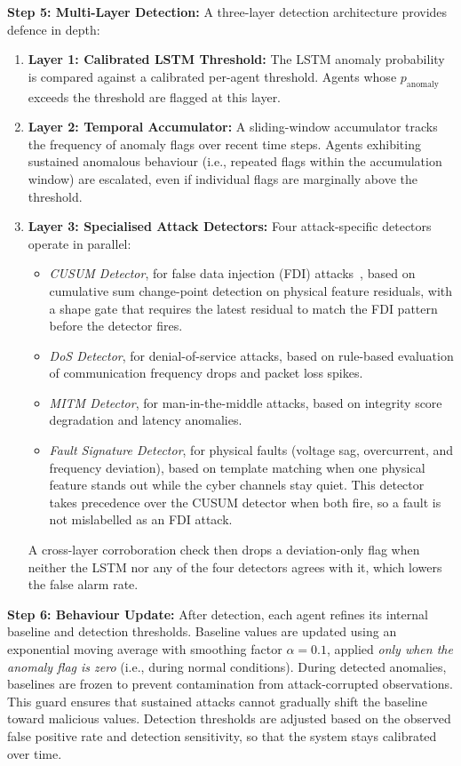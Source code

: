 \par \vspace{0.35cm}
\noindent
\textbf{Step 5: Multi-Layer Detection:} A three-layer detection architecture provides defence in depth:
\begin{enumerate}
    \item \textbf{Layer 1: Calibrated LSTM Threshold:} The LSTM anomaly probability is compared against a calibrated per-agent threshold. Agents whose $p_{\text{anomaly}}$ exceeds the threshold are flagged at this layer.
    \item \textbf{Layer 2: Temporal Accumulator:} A sliding-window accumulator tracks the frequency of anomaly flags over recent time steps. Agents exhibiting sustained anomalous behaviour (i.e., repeated flags within the accumulation window) are escalated, even if individual flags are marginally above the threshold.
    \item \textbf{Layer 3: Specialised Attack Detectors:} Four attack-specific detectors operate in parallel:
    \begin{itemize}
        \item \textit{CUSUM Detector}, for false data injection (FDI) attacks~\cite{liu2009false}, based on cumulative sum change-point detection on physical feature residuals, with a shape gate that requires the latest residual to match the FDI pattern before the detector fires.
        \item \textit{DoS Detector}, for denial-of-service attacks, based on rule-based evaluation of communication frequency drops and packet loss spikes.
        \item \textit{MITM Detector}, for man-in-the-middle attacks, based on integrity score degradation and latency anomalies.
        \item \textit{Fault Signature Detector}, for physical faults (voltage sag, overcurrent, and frequency deviation), based on template matching when one physical feature stands out while the cyber channels stay quiet. This detector takes precedence over the CUSUM detector when both fire, so a fault is not mislabelled as an FDI attack.
    \end{itemize}
    A cross-layer corroboration check then drops a deviation-only flag when neither the LSTM nor any of the four detectors agrees with it, which lowers the false alarm rate.
\end{enumerate}

\par \vspace{0.35cm}
\noindent
\textbf{Step 6: Behaviour Update:} After detection, each agent refines its internal baseline and detection thresholds. Baseline values are updated using an exponential moving average with smoothing factor $\alpha = 0.1$, applied \textit{only when the anomaly flag is zero} (i.e., during normal conditions). During detected anomalies, baselines are frozen to prevent contamination from attack-corrupted observations. This guard ensures that sustained attacks cannot gradually shift the baseline toward malicious values. Detection thresholds are adjusted based on the observed false positive rate and detection sensitivity, so that the system stays calibrated over time.


